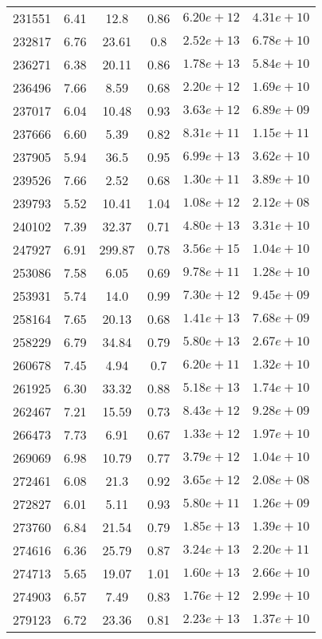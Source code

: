 \begin{table}
\begin{tabular}{cccccc}
231551 & 6.41 & 12.8 & 0.86 & $6.20e+12$ & $4.31e+10$ \\
232817 & 6.76 & 23.61 & 0.8 & $2.52e+13$ & $6.78e+10$ \\
236271 & 6.38 & 20.11 & 0.86 & $1.78e+13$ & $5.84e+10$ \\
236496 & 7.66 & 8.59 & 0.68 & $2.20e+12$ & $1.69e+10$ \\
237017 & 6.04 & 10.48 & 0.93 & $3.63e+12$ & $6.89e+09$ \\
237666 & 6.60 & 5.39 & 0.82 & $8.31e+11$ & $1.15e+11$ \\
237905 & 5.94 & 36.5 & 0.95 & $6.99e+13$ & $3.62e+10$ \\
239526 & 7.66 & 2.52 & 0.68 & $1.30e+11$ & $3.89e+10$ \\
239793 & 5.52 & 10.41 & 1.04 & $1.08e+12$ & $2.12e+08$ \\
240102 & 7.39 & 32.37 & 0.71 & $4.80e+13$ & $3.31e+10$ \\
247927 & 6.91 & 299.87 & 0.78 & $3.56e+15$ & $1.04e+10$ \\
253086 & 7.58 & 6.05 & 0.69 & $9.78e+11$ & $1.28e+10$ \\
253931 & 5.74 & 14.0 & 0.99 & $7.30e+12$ & $9.45e+09$ \\
258164 & 7.65 & 20.13 & 0.68 & $1.41e+13$ & $7.68e+09$ \\
258229 & 6.79 & 34.84 & 0.79 & $5.80e+13$ & $2.67e+10$ \\
260678 & 7.45 & 4.94 & 0.7 & $6.20e+11$ & $1.32e+10$ \\
261925 & 6.30 & 33.32 & 0.88 & $5.18e+13$ & $1.74e+10$ \\
262467 & 7.21 & 15.59 & 0.73 & $8.43e+12$ & $9.28e+09$ \\
266473 & 7.73 & 6.91 & 0.67 & $1.33e+12$ & $1.97e+10$ \\
269069 & 6.98 & 10.79 & 0.77 & $3.79e+12$ & $1.04e+10$ \\
272461 & 6.08 & 21.3 & 0.92 & $3.65e+12$ & $2.08e+08$ \\
272827 & 6.01 & 5.11 & 0.93 & $5.80e+11$ & $1.26e+09$ \\
273760 & 6.84 & 21.54 & 0.79 & $1.85e+13$ & $1.39e+10$ \\
274616 & 6.36 & 25.79 & 0.87 & $3.24e+13$ & $2.20e+11$ \\
274713 & 5.65 & 19.07 & 1.01 & $1.60e+13$ & $2.66e+10$ \\
274903 & 6.57 & 7.49 & 0.83 & $1.76e+12$ & $2.99e+10$ \\
279123 & 6.72 & 23.36 & 0.81 & $2.23e+13$ & $1.37e+10$ \\

\end{tabular}
\end{table}
